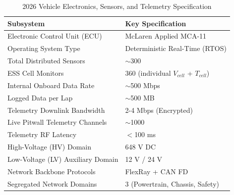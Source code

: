 \begin{table}[h]
\centering
\caption{2026 Vehicle Electronics, Sensors, and Telemetry Specification}
\vspace{0.2cm}
\begin{tabularx}{\textwidth}{@{}XX@{}}
\toprule
\textbf{Subsystem} & \textbf{Key Specification} \\
\midrule
Electronic Control Unit (ECU) & McLaren Applied MCA-11 \\
Operating System Type & Deterministic Real-Time (RTOS) \\
Total Distributed Sensors & $\sim$300 \\
ESS Cell Monitors & 360 (individual $V_{cell}$ + $T_{cell}$) \\
Internal Onboard Data Rate & $\sim$500 Mbps \\
Logged Data per Lap & $\sim$500 MB \\
Telemetry Downlink Bandwidth & 2-4 Mbps (Encrypted) \\
Live Pitwall Telemetry Channels & $\sim$1000 \\
Telemetry RF Latency & $<$100 ms \\
High-Voltage (HV) Domain & 648 V DC \\
Low-Voltage (LV) Auxiliary Domain & 12 V / 24 V \\
Network Backbone Protocols & FlexRay + CAN FD \\
Segregated Network Domains & 3 (Powertrain, Chassis, Safety) \\
\bottomrule
\end{tabularx}
\label{tab:electronics_params}
\end{table}

